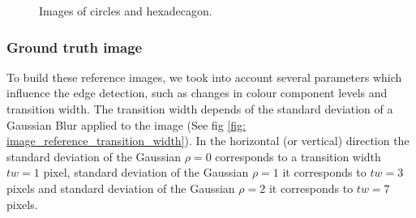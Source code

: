 \documentclass[twoside]{article}
\begin{document}
\begin{figure}
	\centering
	\quad
	\quad
	\caption[Images of circles and hexadecagon.]{Images of circles and hexadecagon.}
	\label{fig:Images of circles and hexadecagon}
\end{figure}






\subsubsection{Ground truth image}
\label{sec:Ground truth image}
To build these reference images, we took into account several parameters which influence the edge detection, such as changes in colour component levels and transition width. 
The transition width depends of the standard deviation of a Gaussian Blur applied to the image (See fig \ref{fig: image_reference_transition_width}). In the horizontal (or vertical) direction the standard deviation of the Gaussian $\rho=0$ corresponds to a transition width  $tw=1$ pixel, standard deviation of the Gaussian $\rho=1$ it corresponds to $tw=3$ pixels and standard deviation of the Gaussian $\rho=2$ it corresponds to $tw=7$ pixels. 
\end{document}
